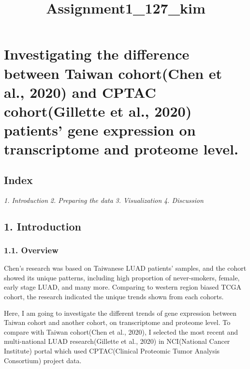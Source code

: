 \documentclass[
]{article}
\title{Assignment1\_127\_kim}
\author{}
\date{\vspace{-2.5em}}
\begin{document}
\maketitle

\hypertarget{investigating-the-difference-between-taiwan-cohortchen-et-al.-2020-and-cptac-cohortgillette-et-al.-2020-patients-gene-expression-on-transcriptome-and-proteome-level.}{%
\section{Investigating the difference between Taiwan cohort(Chen et al.,
2020) and CPTAC cohort(Gillette et al., 2020) patients' gene expression
on transcriptome and proteome
level.}\label{investigating-the-difference-between-taiwan-cohortchen-et-al.-2020-and-cptac-cohortgillette-et-al.-2020-patients-gene-expression-on-transcriptome-and-proteome-level.}}

\hypertarget{index}{%
\subsection{Index}\label{index}}

\emph{1. Introduction} \emph{2. Preparing the data} \emph{3.
Visualization} \emph{4. Discussion}

\hypertarget{introduction}{%
\subsection{1. Introduction}\label{introduction}}

\hypertarget{overview}{%
\subsubsection{1.1. Overview}\label{overview}}

Chen's research was based on Taiwanese LUAD patients' samples, and the
cohort showed its unique patterns, including high proportion of
never-smokers, female, early stage LUAD, and many more. Comparing to
western region biased TCGA cohort, the research indicated the unique
trends shown from each cohorts.

Here, I am going to investigate the different trends of gene expression
between Taiwan cohort and another cohort, on transcriptome and proteome
level. To compare with Taiwan cohort(Chen et al., 2020), I selected the
most recent and multi-national LUAD research(Gillette et al., 2020) in
NCI(National Cancer Institute) portal which used CPTAC(Clinical
Proteomic Tumor Analysis Consortium) project data.
\end{document}

